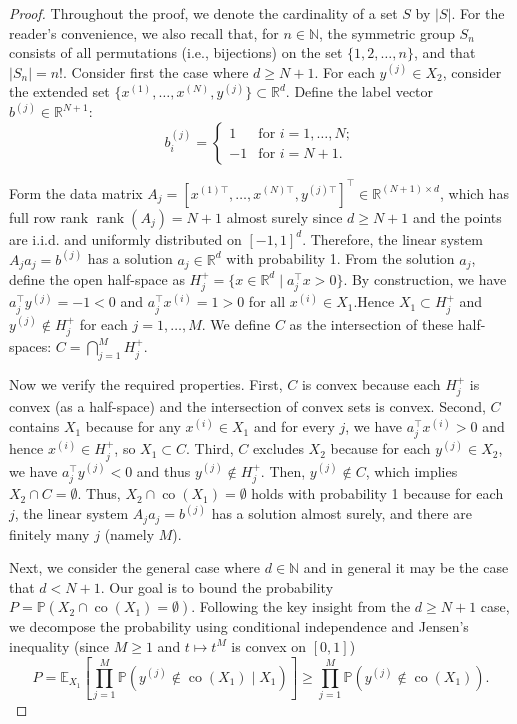 \documentclass[journal]{IEEEtran}
\begin{document}
{\begin{proof}
Throughout the proof, we denote the cardinality of a set $S$ by $|S|$. For the reader's convenience, we also recall that, for $n \in \mathbb{N}$, the symmetric group $S_n$ consists of all permutations (i.e., bijections) on the set $\{1, 2, \ldots, n\}$, and that $|S_n| = n!$. Consider first the case where $d \ge N +1$. For each $y^{(j)} \in X_2$, consider the extended set $\{x^{(1)}, \dots, x^{(N)}, y^{(j)}\} \subset \mathbb{R}^d$. Define the label vector $b^{(j)} \in \mathbb{R}^{N+1}$:
\begin{equation*}
	b^{(j)}_i = \begin{cases} 
		1 & \text{for } i = 1,\dots,N; \\
		-1 & \text{for } i = N+1.
	\end{cases}
\end{equation*}

Form the data matrix $A_j = \left[ x^{(1)\top}, \ldots, x^{(N)\top}, y^{(j)\top} \right]^\top \in \mathbb{R}^{(N+1) \times d}$, which has full row rank $\operatorname{rank}(A_j) = N+1$ almost surely since $d \ge N+1$ and the points are i.i.d. and uniformly distributed on $[-1,1]^d$. Therefore, the linear system $A_j a_j = b^{(j)}$ has a solution $a_j \in \mathbb{R}^d$ with probability 1. From the solution $a_j$, define the open half-space as $H_j^+ = \{ x \in \mathbb{R}^d \mid a_j^\top x > 0 \}$. By construction, we have $a_j^\top y^{(j)} = -1 < 0$ and $	a_j^\top x^{(i)} = 1 > 0 $ for all $ x^{(i)} \in X_1 $.Hence $X_1 \subset H_j^+$ and $y^{(j)} \notin H_j^+$ for each $j=1,\dots,M$. We define $C$ as the intersection of these half-spaces: $C = \bigcap_{j=1}^M H_j^+$. 

Now we verify the required properties. First, $C$ is convex because each $H_j^+$ is convex (as a half-space) and the intersection of convex sets is convex. Second, $C$ contains $X_1$ because for any $x^{(i)} \in X_1$ and for every $j$, we have $a_j^\top x^{(i)} > 0$ and hence $x^{(i)} \in H_j^+$, so $X_1 \subset C$. Third, $C$ excludes $X_2$ because for each $y^{(j)} \in X_2$, we have $a_j^\top y^{(j)} < 0$ and thus $y^{(j)} \notin H_j^+$. Then, $y^{(j)} \notin C$, which implies $X_2 \cap C = \emptyset$. Thus, $X_2 \cap \operatorname{co}(X_1) = \emptyset$ holds with probability 1 because for each $j$, the linear system $A_j a_j = b^{(j)}$ has a solution almost surely, and there are finitely many $j$ (namely $M$). 

Next, we consider the general case where $d \in \mathbb{N}$ and in general it may be the case that $d < N+1$. Our goal is to bound the probability $P = \mathbb{P}\left(X_2 \cap \operatorname{co}(X_1) = \emptyset \right)$. Following the key insight from the $d \ge N+1$ case, we decompose the probability using conditional independence and Jensen's inequality (since $M\ge1$ and $t\mapsto t^M$ is convex on $[0,1]$) 
\begin{equation}
	P = \mathbb{E}_{X_1} \left[ \prod_{j=1}^M \mathbb{P}\!\left(y^{(j)} \notin \operatorname{co}(X_1) \mid X_1\right)\right] \ge \prod\limits_{j = 1}^M {\mathbb{P}\left( y^{(j)} \notin  \operatorname{co}(X_1) \right)}. \label{eq:q}
\end{equation}


\end{proof}}
\end{document}
